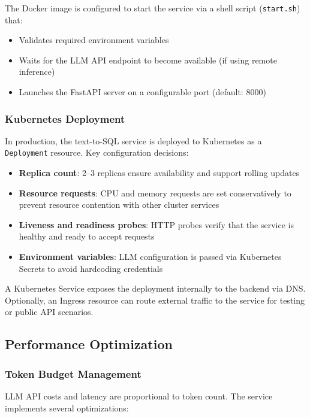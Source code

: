 The Docker image is configured to start the service via a shell script (\texttt{start.sh}) that:

\begin{itemize}
    \item Validates required environment variables
    \item Waits for the LLM API endpoint to become available (if using remote inference)
    \item Launches the FastAPI server on a configurable port (default: 8000)
\end{itemize}

\subsubsection{Kubernetes Deployment}

In production, the text-to-SQL service is deployed to Kubernetes as a \texttt{Deployment} resource. Key configuration decisions:

\begin{itemize}
    \item \textbf{Replica count}: 2--3 replicas ensure availability and support rolling updates
    \item \textbf{Resource requests}: CPU and memory requests are set conservatively to prevent resource contention with other cluster services
    \item \textbf{Liveness and readiness probes}: HTTP probes verify that the service is healthy and ready to accept requests
    \item \textbf{Environment variables}: LLM configuration is passed via Kubernetes Secrets to avoid hardcoding credentials
\end{itemize}

A Kubernetes Service exposes the deployment internally to the backend via DNS. Optionally, an Ingress resource can route external traffic to the service for testing or public API scenarios.

\subsection{Performance Optimization}

\subsubsection{Token Budget Management}

LLM API costs and latency are proportional to token count. The service implements several optimizations:

